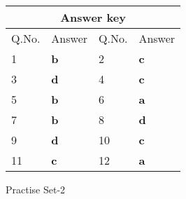 \setlength\arrayrulewidth{1pt}
\begin{table}[H]
	\centering
	\begin{tabular}{|p{1.5cm}|p{1.5cm}||p{1.5cm}|p{1.5cm}|}
		\hline
		\multicolumn{4}{|c|}{\textbf{Answer key}}\\\hline\hline
		\rowcolor{ocrel}Q.No.&Answer&Q.No.&Answer\\\hline
		1&\textbf{b} &2&\textbf{c}\\\hline 
		3&\textbf{d} &4&\textbf{c} \\\hline
		5&\textbf{b} &6&\textbf{a} \\\hline
		7&\textbf{b}&8&\textbf{d}\\\hline
		9&\textbf{d}&10&\textbf{c}\\\hline
		11&\textbf{c} &12&\textbf{a}\\\hline
		
	\end{tabular}
\end{table}
\newpage
\begin{abox}
	Practise Set-2
\end{abox}

